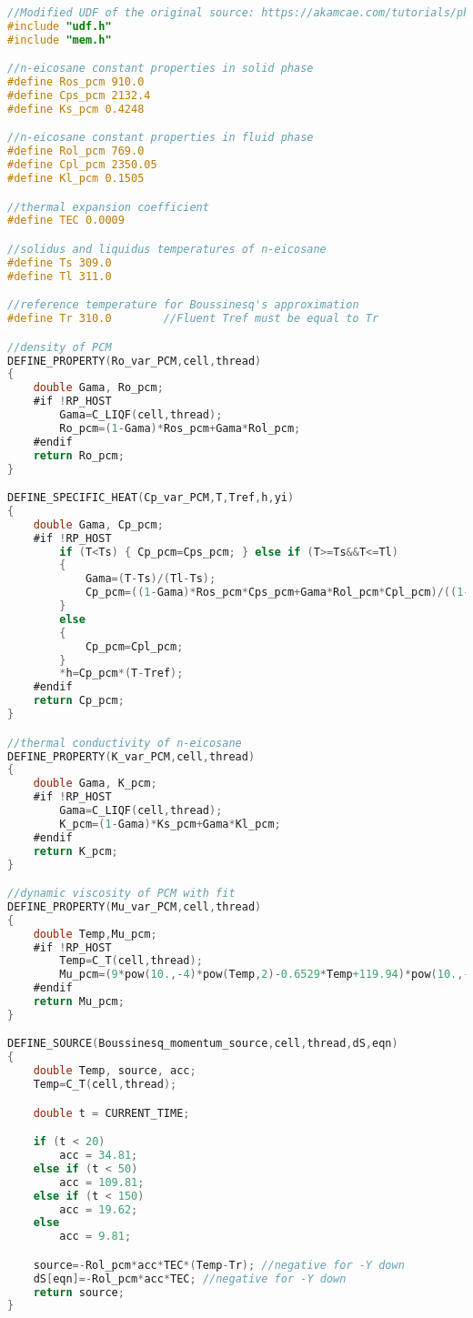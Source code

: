 \begin{lstlisting}[language=C, caption={Vollständige \ac{pcm} \ac{udf} eicosane.c}, label={lst:udf_rest}]
//Modified UDF of the original source: https://akamcae.com/tutorials/phase-change-material-simulation-in-ansys-fluent/
#include "udf.h"
#include "mem.h"

//n-eicosane constant properties in solid phase
#define Ros_pcm 910.0
#define Cps_pcm 2132.4
#define Ks_pcm 0.4248

//n-eicosane constant properties in fluid phase
#define Rol_pcm 769.0
#define Cpl_pcm 2350.05
#define Kl_pcm 0.1505

//thermal expansion coefficient
#define TEC 0.0009

//solidus and liquidus temperatures of n-eicosane
#define Ts 309.0
#define Tl 311.0

//reference temperature for Boussinesq's approximation
#define Tr 310.0		//Fluent Tref must be equal to Tr

//density of PCM
DEFINE_PROPERTY(Ro_var_PCM,cell,thread)
{
	double Gama, Ro_pcm;
	#if !RP_HOST
		Gama=C_LIQF(cell,thread);
		Ro_pcm=(1-Gama)*Ros_pcm+Gama*Rol_pcm;
	#endif
	return Ro_pcm;
}

DEFINE_SPECIFIC_HEAT(Cp_var_PCM,T,Tref,h,yi)
{
	double Gama, Cp_pcm;
	#if !RP_HOST
		if (T<Ts) { Cp_pcm=Cps_pcm; } else if (T>=Ts&&T<=Tl)
		{
			Gama=(T-Ts)/(Tl-Ts);
			Cp_pcm=((1-Gama)*Ros_pcm*Cps_pcm+Gama*Rol_pcm*Cpl_pcm)/((1-Gama)*Ros_pcm+Gama*Rol_pcm);
		}
		else
		{
			Cp_pcm=Cpl_pcm;
		}
		*h=Cp_pcm*(T-Tref);
	#endif
	return Cp_pcm;
}

//thermal conductivity of n-eicosane
DEFINE_PROPERTY(K_var_PCM,cell,thread)
{
	double Gama, K_pcm;
	#if !RP_HOST
		Gama=C_LIQF(cell,thread);
		K_pcm=(1-Gama)*Ks_pcm+Gama*Kl_pcm;
	#endif
	return K_pcm;
}

//dynamic viscosity of PCM with fit
DEFINE_PROPERTY(Mu_var_PCM,cell,thread)
{
	double Temp,Mu_pcm;
	#if !RP_HOST
		Temp=C_T(cell,thread);
		Mu_pcm=(9*pow(10.,-4)*pow(Temp,2)-0.6529*Temp+119.94)*pow(10.,-3);
	#endif
	return Mu_pcm;
}

DEFINE_SOURCE(Boussinesq_momentum_source,cell,thread,dS,eqn)
{
	double Temp, source, acc;
	Temp=C_T(cell,thread);

	double t = CURRENT_TIME;

	if (t < 20)
		acc = 34.81;
	else if (t < 50)
		acc = 109.81;
	else if (t < 150)
		acc = 19.62;
	else
		acc = 9.81;

	source=-Rol_pcm*acc*TEC*(Temp-Tr); //negative for -Y down
	dS[eqn]=-Rol_pcm*acc*TEC; //negative for -Y down
	return source;
}
\end{lstlisting}

